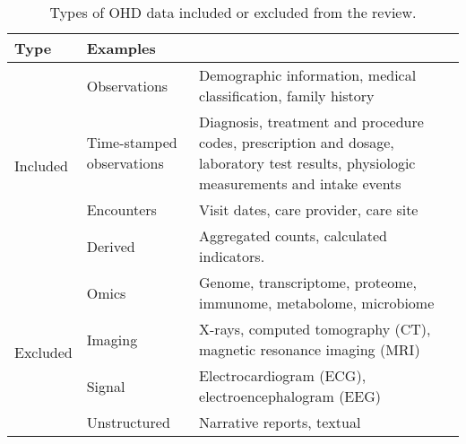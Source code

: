 \begin{table}[htb]
\center
\footnotesize
  \caption{Types of OHD data included or excluded from the review.}\label{tab:datatypes}
  
  \begin{tabularx}{\textwidth}{@{} p{}Xp{}@{}}\toprule
  Type & Examples \\ \midrule
  
  \multirow{4}{*}{Included} & Observations & Demographic information, medical classification, family history \\
  
  &Time-stamped observations & Diagnosis, treatment and procedure codes, prescription and dosage, laboratory test results, physiologic measurements and intake events \\
  &Encounters & Visit dates, care provider, care site \\
  &Derived & Aggregated counts, calculated indicators. \\ \midrule

  \multirow{4}{*}{Excluded} & Omics & Genome, transcriptome, proteome, immunome, metabolome, microbiome \\
  &Imaging & X-rays, computed tomography (CT), magnetic resonance imaging (MRI) \\
  &Signal & Electrocardiogram (ECG), electroencephalogram (EEG) \\
  &Unstructured & Narrative reports, textual \\ \bottomrule
  \end{tabularx}%
\end{table}